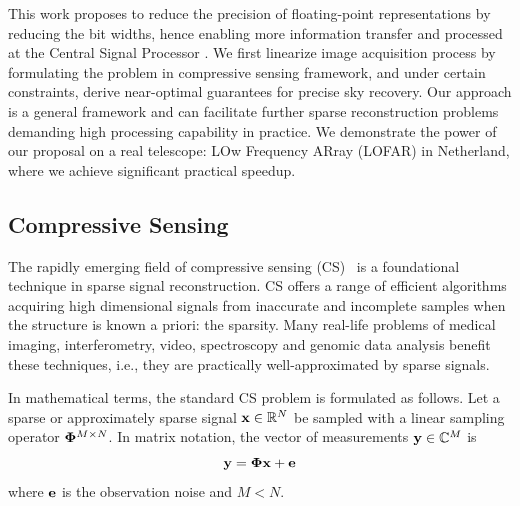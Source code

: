 \documentclass{article}
\begin{document}
This work proposes to reduce the precision of floating-point representations by reducing the bit widths, hence enabling more information transfer and processed at the Central Signal Processor \cite{rik2016ska}. We first linearize image acquisition process by formulating the problem in compressive sensing framework, and under certain constraints, derive near-optimal guarantees for precise sky recovery. Our approach is a general framework and can facilitate further sparse reconstruction problems demanding high processing capability in practice. We demonstrate the power of our proposal on a real telescope: LOw Frequency ARray (LOFAR) in Netherland, where we achieve significant practical speedup.


\subsection{Compressive Sensing}
The rapidly emerging field of compressive sensing (CS)~\cite{donoho2006cs, candes2006cs, candes2006cs2} is a foundational technique in sparse signal reconstruction. CS offers a range of efficient algorithms acquiring high dimensional signals from inaccurate and incomplete samples when the structure is known a priori: the sparsity. Many real-life problems of medical imaging, interferometry, video, spectroscopy and genomic data analysis  benefit these techniques, i.e., they are practically well-approximated by sparse signals.

In mathematical terms, the standard CS problem is formulated as follows. Let a sparse or approximately sparse signal ${\bf x}\in \mathbb{R}^N$ be sampled with a linear sampling operator ${\bf \Phi}^{M\times N}$. In matrix notation, the vector of measurements ${\bf y} \in \mathbb{C}^M$ is
\begin{equation}
 {\bf y} =  {\bf \Phi}  {\bf x} + {\bf e}
\end{equation}
where ${\bf e}$ is the observation noise and $M < N$.
\end{document}
